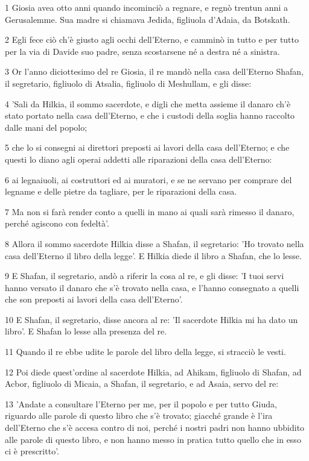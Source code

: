 \par 1 Giosia avea otto anni quando incominciò a regnare, e regnò trentun anni a Gerusalemme. Sua madre si chiamava Jedida, figliuola d'Adaia, da Botskath.
\par 2 Egli fece ciò ch'è giusto agli occhi dell'Eterno, e camminò in tutto e per tutto per la via di Davide suo padre, senza scostarsene né a destra né a sinistra.
\par 3 Or l'anno diciottesimo del re Giosia, il re mandò nella casa dell'Eterno Shafan, il segretario, figliuolo di Atsalia, figliuolo di Meshullam, e gli disse:
\par 4 'Sali da Hilkia, il sommo sacerdote, e digli che metta assieme il danaro ch'è stato portato nella casa dell'Eterno, e che i custodi della soglia hanno raccolto dalle mani del popolo;
\par 5 che lo si consegni ai direttori preposti ai lavori della casa dell'Eterno; e che questi lo diano agli operai addetti alle riparazioni della casa dell'Eterno:
\par 6 ai legnaiuoli, ai costruttori ed ai muratori, e se ne servano per comprare del legname e delle pietre da tagliare, per le riparazioni della casa.
\par 7 Ma non si farà render conto a quelli in mano ai quali sarà rimesso il danaro, perché agiscono con fedeltà'.
\par 8 Allora il sommo sacerdote Hilkia disse a Shafan, il segretario: 'Ho trovato nella casa dell'Eterno il libro della legge'. E Hilkia diede il libro a Shafan, che lo lesse.
\par 9 E Shafan, il segretario, andò a riferir la cosa al re, e gli disse: 'I tuoi servi hanno versato il danaro che s'è trovato nella casa, e l'hanno consegnato a quelli che son preposti ai lavori della casa dell'Eterno'.
\par 10 E Shafan, il segretario, disse ancora al re: 'Il sacerdote Hilkia mi ha dato un libro'. E Shafan lo lesse alla presenza del re.
\par 11 Quando il re ebbe udite le parole del libro della legge, si stracciò le vesti.
\par 12 Poi diede quest'ordine al sacerdote Hilkia, ad Ahikam, figliuolo di Shafan, ad Acbor, figliuolo di Micaia, a Shafan, il segretario, e ad Asaia, servo del re:
\par 13 'Andate a consultare l'Eterno per me, per il popolo e per tutto Giuda, riguardo alle parole di questo libro che s'è trovato; giacché grande è l'ira dell'Eterno che s'è accesa contro di noi, perché i nostri padri non hanno ubbidito alle parole di questo libro, e non hanno messo in pratica tutto quello che in esso ci è prescritto'.
